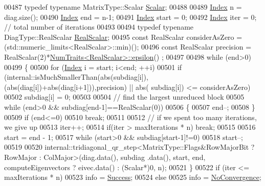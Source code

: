 \begin{DoxyCode}
00487   \textcolor{keyword}{typedef} \textcolor{keyword}{typename} MatrixType::Scalar \hyperlink{group___eigenvalues___module_a0bfcedf4245b6846007ca4f01e4feb1f}{Scalar};
00488 
00489   \hyperlink{group___eigenvalues___module_a8a59ab7734b6eae2754fd78bc7c3a360}{Index} n = diag.size();
00490   \hyperlink{group___eigenvalues___module_a8a59ab7734b6eae2754fd78bc7c3a360}{Index} end = n-1;
00491   \hyperlink{group___eigenvalues___module_a8a59ab7734b6eae2754fd78bc7c3a360}{Index} start = 0;
00492   \hyperlink{group___eigenvalues___module_a8a59ab7734b6eae2754fd78bc7c3a360}{Index} iter = 0; \textcolor{comment}{// total number of iterations}
00493   
00494   \textcolor{keyword}{typedef} \textcolor{keyword}{typename} DiagType::RealScalar \hyperlink{group___eigenvalues___module_a5dae5f422a3c71060e6bd31332bf64fd}{RealScalar};
00495   \textcolor{keyword}{const} RealScalar considerAsZero = (std::numeric\_limits<RealScalar>::min)();
00496   \textcolor{keyword}{const} RealScalar precision = RealScalar(2)*\hyperlink{group___core___module_struct_eigen_1_1_num_traits}{NumTraits<RealScalar>::epsilon}()
      ;
00497   
00498   \textcolor{keywordflow}{while} (end>0)
00499   \{
00500     \textcolor{keywordflow}{for} (\hyperlink{group___eigenvalues___module_a8a59ab7734b6eae2754fd78bc7c3a360}{Index} i = start; i<end; ++i)
00501       \textcolor{keywordflow}{if} (internal::isMuchSmallerThan(abs(subdiag[i]),(abs(diag[i])+abs(diag[i+1])),precision) || abs(
      subdiag[i]) <= considerAsZero)
00502         subdiag[i] = 0;
00503 
00504     \textcolor{comment}{// find the largest unreduced block}
00505     \textcolor{keywordflow}{while} (end>0 && subdiag[end-1]==RealScalar(0))
00506     \{
00507       end--;
00508     \}
00509     \textcolor{keywordflow}{if} (end<=0)
00510       \textcolor{keywordflow}{break};
00511 
00512     \textcolor{comment}{// if we spent too many iterations, we give up}
00513     iter++;
00514     \textcolor{keywordflow}{if}(iter > maxIterations * n) \textcolor{keywordflow}{break};
00515 
00516     start = end - 1;
00517     \textcolor{keywordflow}{while} (start>0 && subdiag[start-1]!=0)
00518       start--;
00519 
00520     internal::tridiagonal\_qr\_step<MatrixType::Flags&RowMajorBit ? RowMajor : ColMajor>(diag.data(), subdiag
      .data(), start, end, computeEigenvectors ? eivec.data() : (Scalar*)0, n);
00521   \}
00522   \textcolor{keywordflow}{if} (iter <= maxIterations * n)
00523     info = \hyperlink{group__enums_gga85fad7b87587764e5cf6b513a9e0ee5ea52581b035f4b59c203b8ff999ef5fcea}{Success};
00524   \textcolor{keywordflow}{else}
00525     info = \hyperlink{group__enums_gga85fad7b87587764e5cf6b513a9e0ee5eaba1c8763d1179778070f365ecc4157a8}{NoConvergence};

\end{DoxyCode}
